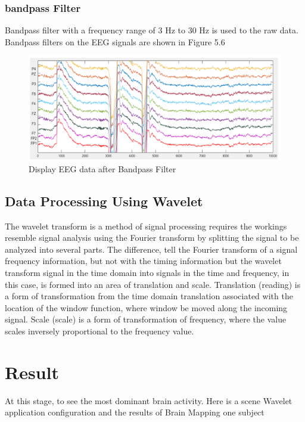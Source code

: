 \subsubsection{bandpass Filter}
\par
Bandpass filter with a frequency range of 3 Hz to 30 Hz is used to the raw data. Bandpass filters on the EEG signals are shown in Figure 5.6
\begin{figure}[h!]
\centering
\includegraphics[scale=0.6]{figures/56.PNG}
\caption{Display EEG data after Bandpass Filter}
\label{labelgambar10}
\end{figure}

\subsection{Data Processing Using Wavelet}
\par
The wavelet transform is a method of signal processing requires the workings resemble signal analysis using the Fourier transform by splitting the signal to be analyzed into several parts. The difference, tell the Fourier transform of a signal frequency information, but not with the timing information but the wavelet transform signal in the time domain into signals in the time and frequency, in this case, is formed into an area of translation and scale. Translation (reading) is a form of transformation from the time domain translation associated with the location of the window function, where window be moved along the incoming signal. Scale (scale) is a form of transformation of frequency, where the value scales inversely proportional to the frequency value.

\section{Result}
\par
At this stage, to see the most dominant brain activity. Here is a scene Wavelet application configuration and the results of Brain Mapping one subject

